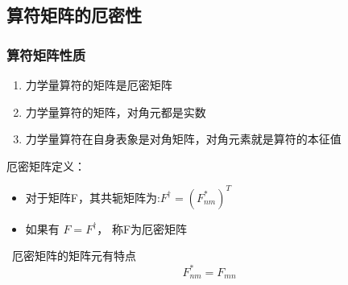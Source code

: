 \subsection{算符矩阵的厄密性}

\begin{frame} 
    \frametitle{算符矩阵性质} 
    \begin{enumerate}
    \item  力学量算符的矩阵是厄密矩阵 
    \item  力学量算符的矩阵，对角元都是实数
    \item  力学量算符在自身表象是对角矩阵，对角元素就是算符的本征值
    \end{enumerate}
\end{frame}

\begin{frame} 
    \begin{tcolorbox1}{厄密矩阵定义：}
        \begin{itemize}
        \item 对于矩阵F，其共轭矩阵为:$F^{\dagger } =(F_{nm} ^*)^T$
        \item 如果有 $F= F^{\dagger }$， 称F为厄密矩阵
        \end{itemize}
    \Tips~厄密矩阵的矩阵元有特点 $$  F_{nm}^* = F_{mn}  $$
    \end{tcolorbox1}
\end{frame}

